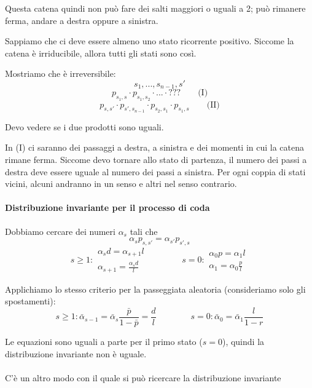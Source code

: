 \documentclass[a4paper,12pt]{book}
\newcommand\ddfrac[2]{\frac{\displaystyle #1}{\displaystyle #2}}
\begin{document}
Questa catena quindi non può fare dei salti maggiori o uguali a 2; può rimanere ferma, andare a destra oppure a sinistra. 

Sappiamo che ci deve essere almeno uno stato ricorrente positivo. Siccome la catena è irriducibile, allora tutti gli stati sono così. 

Mostriamo che è irreversibile:
$$ s_1, ..., s_{n-1}, s' $$
$$ p_{s_1, s} \cdot p_{s_1, s_2} \cdot ... \cdot ??? \qquad \text{(I)}$$ %
$$ p_{s,s'} \cdot p_{s', s_{n-1}} \cdot p_{s_2, s_1} \cdot p_{s_1, s} \qquad \text{(II)}$$

Devo vedere se i due prodotti sono uguali. 

In (I) ci saranno dei passaggi a destra, a sinistra e dei momenti in cui la catena rimane ferma. Siccome devo tornare allo stato di partenza, il numero dei passi a destra deve essere uguale al numero dei passi a sinistra. Per ogni coppia di stati vicini, alcuni andranno in un senso e altri nel senso contrario. 


\paragraph{Distribuzione invariante per il processo di coda} Dobbiamo cercare dei numeri $ \alpha_s $ tali che 
$$ \alpha_{s}p_{s,s'} = \alpha_{s'}p_{s',s} $$
$$ s \ge 1: \begin{array}{c}
	\alpha_{s}d = \alpha_{s+1}l \\
	\alpha_{s+1} = \ddfrac{\alpha_{s}d}{l}
\end{array} \qquad \qquad s = 0: \begin{array}{c}
	\alpha_{0}p = \alpha_{1} l \\
	\alpha_{1} = \alpha_{0}\ddfrac{p}{l}
\end {array} $$

Applichiamo lo stesso criterio per la passeggiata aleatoria (consideriamo solo gli spostamenti):
$$ s \ge 1: 
	\bar{\alpha}_{s-1} = \bar{\alpha}_s \ddfrac{\bar{p}}{1-\bar{p}} = \ddfrac{d}{l}
	\qquad \qquad s = 0: 
	\bar{\alpha}_{0} = \bar{\alpha}_{1} \ddfrac{l}{1-r}
$$

Le equazioni sono uguali a parte per il primo stato ($ s=0 $), quindi la distribuzione invariante non è uguale. 
\\
\\
C'è un altro modo con il quale si può ricercare la distribuzione invariante %
\end{document}
